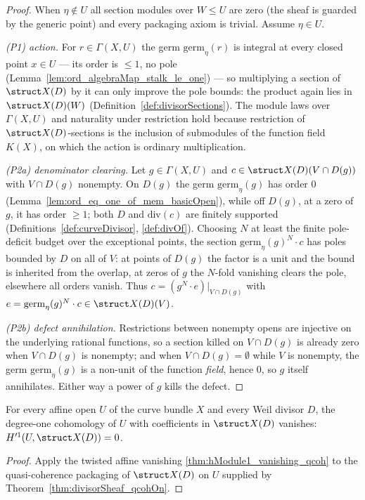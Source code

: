 \begin{proof}
  \leanok
  When \(\eta \notin U\) all section modules over \(W \le U\) are zero (the sheaf is guarded by the
  generic point) and every packaging axiom is trivial. Assume \(\eta \in U\).

  \emph{(P1) action.} For \(r \in \Gamma(X, U)\) the germ \(\mathrm{germ}_\eta(r)\) is integral at
  every closed point \(x \in U\) --- its order is \(\le 1\), no pole (Lemma~\ref{lem:ord_algebraMap_stalk_le_one})
  --- so multiplying a section of \(\struct X(D)\) by it can only improve the pole bounds: the
  product again lies in \(\struct X(D)(W)\) (Definition~\ref{def:divisorSections}). The module laws
  over \(\Gamma(X, U)\) and naturality under restriction hold because restriction of \(\struct
  X(D)\)-sections is the inclusion of submodules of the function field \(K(X)\), on which the action
  is ordinary multiplication.

  \emph{(P2a) denominator clearing.} Let \(g \in \Gamma(X, U)\) and \(c \in \struct X(D)(V \cap
  D(g))\) with \(V \cap D(g)\) nonempty. On \(D(g)\) the germ \(\mathrm{germ}_\eta(g)\) has order
  \(0\) (Lemma~\ref{lem:ord_eq_one_of_mem_basicOpen}), while off \(D(g)\), at a zero of \(g\), it
  has order \(\ge 1\); both \(D\) and \(\mathrm{div}(c)\) are finitely supported
  (Definitions~\ref{def:curveDivisor}, \ref{def:divOf}). Choosing \(N\) at least the finite
  pole-deficit budget over the exceptional points, the section \(\mathrm{germ}_\eta(g)^N \cdot c\)
  has poles bounded by \(D\) on all of \(V\): at points of \(D(g)\) the factor is a unit and the
  bound is inherited from the overlap, at zeros of \(g\) the \(N\)-fold vanishing clears the pole,
  elsewhere all orders vanish. Thus \(c = (g^N \cdot e)|_{V \cap D(g)}\) with \(e =
  \mathrm{germ}_\eta(g)^N \cdot c \in \struct X(D)(V)\).

  \emph{(P2b) defect annihilation.} Restrictions between nonempty opens are injective on the
  underlying rational functions, so a section killed on \(V \cap D(g)\) is already zero when \(V
  \cap D(g)\) is nonempty; and when \(V \cap D(g) = \emptyset\) while \(V\) is nonempty, the germ
  \(\mathrm{germ}_\eta(g)\) is a non-unit of the function \emph{field}, hence \(0\), so \(g\) itself
  annihilates. Either way a power of \(g\) kills the defect.
\end{proof}

\begin{theorem}
  \label{thm:subsingleton_hModule_divisorSheaf_one}
  \leanok
  For every affine open \(U\) of the curve bundle \(X\) and every Weil divisor \(D\), the
  degree-one cohomology of \(U\) with coefficients in \(\struct X(D)\) vanishes: \(H'^1(U, \struct
  X(D)) = 0\).
\end{theorem}
\begin{proof}
  \leanok
  Apply the twisted affine vanishing \ref{thm:hModule1_vanishing_qcoh} to the quasi-coherence
  packaging of \(\struct X(D)\) on \(U\) supplied by Theorem~\ref{thm:divisorSheaf_qcohOn}.
\end{proof}

